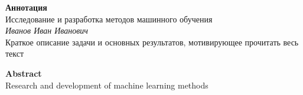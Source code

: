 \begin{center}

    \large\textbf{Аннотация}\\[1 cm]

    \large{Исследование и разработка методов машинного обучения} \\
    \large\textit{Иванов Иван Иванович} \\[1 cm]

    Краткое описание задачи и основных результатов, мотивирующее прочитать весь текст

    \vfill

    \textbf{Abstract} \\[1 cm]

    Research and development of machine learning methods

\end{center}